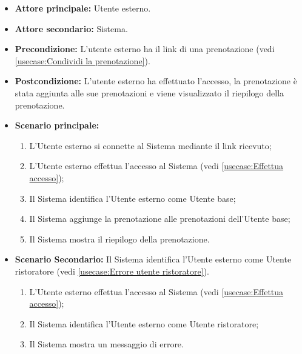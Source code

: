 \label{usecase:Accedi alla prenotazione}
\begin{itemize}
	\item \textbf{Attore principale:} Utente esterno.

	\item \textbf{Attore secondario:} Sistema.

	\item \textbf{Precondizione:} L'utente esterno ha il link di una prenotazione
	      (vedi \autoref{usecase:Condividi la prenotazione}).

	\item \textbf{Postcondizione:} L'utente esterno ha effettuato l'accesso, la
	      prenotazione è stata aggiunta alle sue prenotazioni e viene visualizzato il
	      riepilogo della prenotazione.

	\item \textbf{Scenario principale:}
	      \begin{enumerate}
		      \item L'Utente esterno si connette al Sistema mediante il link ricevuto;
		      \item L'Utente esterno effettua l'accesso al Sistema (vedi
		            \autoref{usecase:Effettua accesso});
		      \item Il Sistema identifica l'Utente esterno come Utente base;
		      \item Il Sistema aggiunge la prenotazione alle prenotazioni dell'Utente base;
		      \item Il Sistema mostra il riepilogo della prenotazione.
	      \end{enumerate}

	\item \textbf{Scenario Secondario:}
	      Il Sistema identifica l'Utente esterno come Utente ristoratore (vedi
	      \autoref{usecase:Errore utente ristoratore}).
	      \begin{enumerate}
		      \item L'Utente esterno effettua l'accesso al Sistema (vedi
		            \autoref{usecase:Effettua accesso});
		      \item Il Sistema identifica l'Utente esterno come Utente ristoratore;
		      \item Il Sistema mostra un messaggio di errore.
	      \end{enumerate}
\end{itemize}
